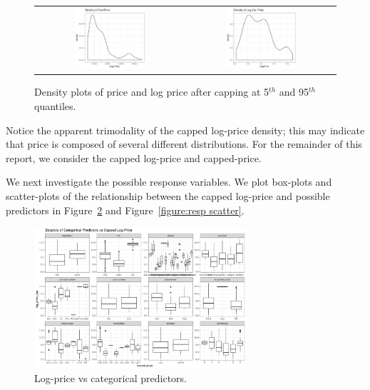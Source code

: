\documentclass[a4paper, 10pt, titlepage]{article}
\begin{document}
\begin{figure}[!ht]
	\centering
	   \begin{tabular}{cc}
	      \includegraphics[width = 0.5\textwidth]{price_dense.png}  & \includegraphics[width = 0.5\textwidth]{logprice_dense.png} 
	   \end{tabular}
	\caption{Density plots of price and log price after capping at 5$^{th}$ and 95$^{th}$ quantiles.}
	\label{figure:capped density}
\end{figure}

Notice the apparent trimodality of the capped log-price density; this may indicate that price is composed of several different distributions. For the remainder of this report, we consider the capped log-price and capped-price.

\par

We next investigate the possible response variables. We plot box-plots and scatter-plots of the relationship between the capped log-price and possible predictors in Figure~\ref{figure:resp box} and Figure~\ref{figure:resp scatter}.

	\begin{figure}[!ht]
	\centering
	    \includegraphics[width = 0.7\textwidth]{resp_box.png}
	\caption{Log-price vs categorical predictors.}
	\label{figure:resp box}
    \end{figure}
\end{document}
